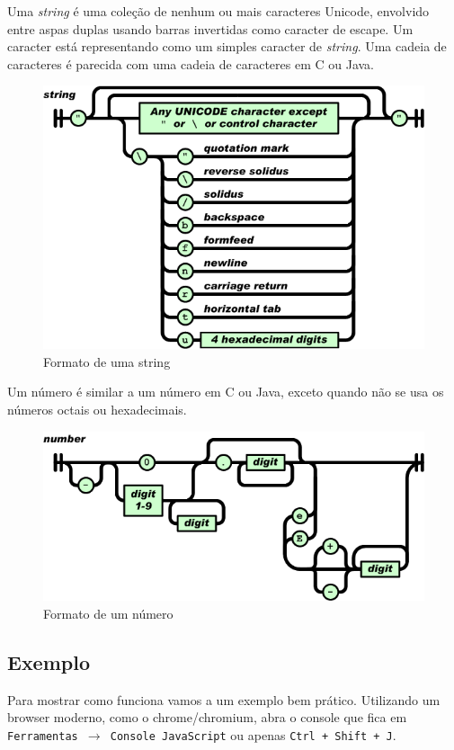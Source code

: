 Uma \textit{string} é uma coleção de nenhum ou mais caracteres Unicode, envolvido entre aspas duplas usando
barras invertidas como caracter de escape. Um caracter está representando como um simples caracter
de \textit{string}. Uma cadeia de caracteres é parecida com uma cadeia de caracteres em C ou Java.

\begin{figure}
\centering
\includegraphics[scale=0.5]{img/json/string.png}
\caption{Formato de uma string}
\end{figure}

Um número é similar a um número em C ou Java, exceto quando não se usa os números octais ou hexadecimais.

\begin{figure}
\centering
\includegraphics[scale=0.5]{img/json/number.png}
\caption{Formato de um número}
\end{figure}

\subsection*{Exemplo}

Para mostrar como funciona vamos a um exemplo bem prático. Utilizando um browser moderno, como o
chrome/chromium, abra o console que fica em \texttt{Ferramentas $\rightarrow$ Console JavaScript} ou
apenas \texttt{Ctrl + Shift + J}.

